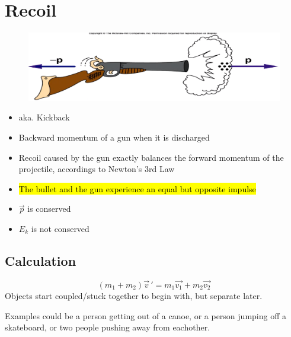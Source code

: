 \documentclass[a4paper,12pt]{article}
\begin{document}
\section{Recoil}
\begin{figure}[H]
    \centering
    \includegraphics[width=\textwidth]{recoil}
\end{figure}
\begin{itemize}
    \item{aka. Kickback}
    \item{Backward momentum of a gun when it is discharged}
    \item{Recoil caused by the gun exactly balances the forward momentum of the projectile, accordings to Newton's 3rd Law}
    \item{\hl{The bullet and the gun experience an equal but opposite impulse}}
    \item{$\vec{p}$ is conserved}
    \item{$E_k$ is not conserved}
\end{itemize}

\subsection{Calculation}
\Large $$(m_1 + m_2)\vec{v}\,' = m_1\vec{v_1} + m_2\vec{v_2}$$ \normalsize
Objects start coupled/stuck together to begin with, but separate later.

Examples could be a person getting out of a canoe, or a person jumping off a skateboard, or two people pushing away from eachother.
\end{document}
